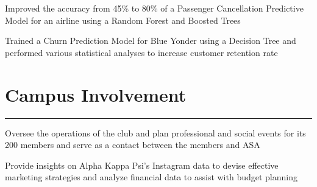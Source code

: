 \documentclass[]{sahana}
\begin{document}
\begin{minipage}[t]{0.66\textwidth}
\vspace{-4pt}
\noindent
\begin{tightemize}
\vspace{-6pt}
\item Improved the accuracy from 45\% to 80\% of a Passenger Cancellation Predictive Model for an airline using a Random Forest and Boosted Trees 
\item Trained a Churn Prediction Model for Blue Yonder using a Decision Tree and performed various statistical analyses to increase customer retention rate
\end{tightemize}
\sectionsep

\section{Campus Involvement}
\noindent\rule{12.5cm}{0.4pt}

\vspace{-6pt}
\begin{tightemize}
\item Oversee the operations of the club and plan professional and social events for its 200 members and serve as a contact between the members and ASA
\end{tightemize}
\vspace{1pt}

\vspace{-5pt}
\begin{tightemize}
\item Provide insights on Alpha Kappa Psi's Instagram data to devise effective marketing strategies and analyze financial data to assist with budget planning 
\end{tightemize}
\vspace{1pt}


\end{minipage}
\end{document}

